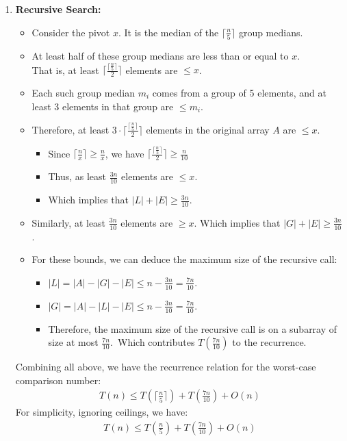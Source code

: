 \documentclass[11pt, a4paper, oneside]{memoir}
\begin{document}
\begin{enumerate}
    \item \textbf{Recursive Search:}
    \begin{itemize}
        \item Consider the pivot $x$. It is the median of the $\lceil \frac{n}{5} \rceil$ group medians.
        \item At least half of these group medians are less than or equal to $x$.\\
        That is, at least $\lceil \frac{\lceil \frac{n}{5} \rceil}{2} \rceil$ elements are $\leq x$.
        \item Each such group median $m_i$ comes from a group of 5 elements, and at least 3 elements in that group are $\leq m_i$.
        \item Therefore, at least $3 \cdot \lceil \frac{\lceil \frac{n}{5} \rceil}{2} \rceil$ elements in the original array $A$ are $\leq x$.
        \begin{itemize}
            \item Since $\lceil \frac{n}{x} \rceil \geq \frac{n}{x}$, we have $\lceil \frac{\lceil \frac{n}{5} \rceil}{2} \rceil \geq \frac{n}{10}$
            \item Thus, as least $\frac{3n}{10}$ elements are $\leq x$.
            \item Which implies that $|L| + |E| \ge \frac{3n}{10}$.
        \end{itemize}
        \item Similarly, at least $\frac{3n}{10}$ elements are $\geq x$. Which implies that $|G| + |E| \ge \frac{3n}{10}$.
        \item For these bounds, we can deduce the maximum size of the recursive call:
        \begin{itemize}
            \item $|L| = |A| - |G| - |E| \leq n - \frac{3n}{10} = \frac{7n}{10}$.
            \item $|G| = |A| - |L| - |E| \leq n - \frac{3n}{10} = \frac{7n}{10}$.
            \item Therefore, the maximum size of the recursive call is on a subarray of size at most $\frac{7n}{10}$.\
            Which contributes $T(\frac{7n}{10})$ to the recurrence.
        \end{itemize}
    \end{itemize}
    Combining all above, we have the recurrence relation for the worst-case comparison number:
    \begin{align*}
        T(n) \leq T(\lceil \frac{n}{5} \rceil) + T(\frac{7n}{10}) + O(n)
    \end{align*}
    For simplicity, ignoring ceilings, we have:
    \begin{align*}
        T(n) \leq T(\frac{n}{5}) + T(\frac{7n}{10}) + O(n)
    \end{align*}
\end{enumerate}
\end{document}
